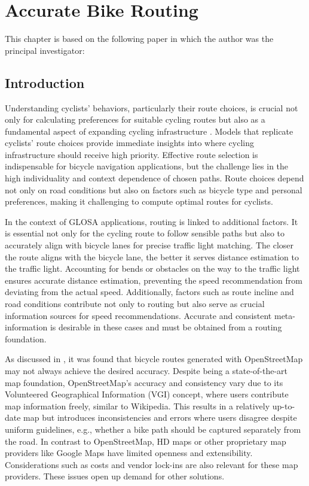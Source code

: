 \chapter{Accurate Bike Routing}\label{ch:routing}

\begin{Summary}
This chapter is based on the following paper in which the author was the principal investigator:

\cite{matthes2023accurate} 
\end{Summary}

\section{Introduction}

Understanding cyclists' behaviors, particularly their route choices, is crucial not only for calculating preferences for suitable cycling routes but also as a fundamental aspect of expanding cycling infrastructure \cite{huber_modelling_2021}. Models that replicate cyclists' route choices provide immediate insights into where cycling infrastructure should receive high priority. Effective route selection is indispensable for bicycle navigation applications, but the challenge lies in the high individuality and context dependence of chosen paths. Route choices depend not only on road conditions but also on factors such as bicycle type and personal preferences, making it challenging to compute optimal routes for cyclists.

In the context of GLOSA applications, routing is linked to additional factors. It is essential not only for the cycling route to follow sensible paths but also to accurately align with bicycle lanes for precise traffic light matching. The closer the route aligns with the bicycle lane, the better it serves distance estimation to the traffic light. Accounting for bends or obstacles on the way to the traffic light ensures accurate distance estimation, preventing the speed recommendation from deviating from the actual speed. Additionally, factors such as route incline and road conditions contribute not only to routing but also serve as crucial information sources for speed recommendations. Accurate and consistent meta-information is desirable in these cases and must be obtained from a routing foundation.

As discussed in , it was found that bicycle routes generated with OpenStreetMap may not always achieve the desired accuracy. Despite being a state-of-the-art map foundation, OpenStreetMap's accuracy and consistency vary due to its Volunteered Geographical Information (VGI) concept, where users contribute map information freely, similar to Wikipedia. This results in a relatively up-to-date map but introduces inconsistencies and errors where users disagree despite uniform guidelines, e.g., whether a bike path should be captured separately from the road. In contrast to OpenStreetMap, HD maps or other proprietary map providers like Google Maps have limited openness and extensibility. Considerations such as costs and vendor lock-ins are also relevant for these map providers. These issues open up demand for other solutions.

